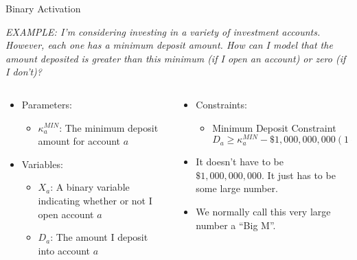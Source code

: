 \documentclass[10pt, aspectratio=169]{beamer}
\begin{document}
\begin{frame}{Binary Activation}
    \begin{center}
        \textit{EXAMPLE: I'm considering investing in a variety of investment accounts. However, each one has a minimum deposit amount. How can I model that the amount deposited is greater than this minimum (if I open an account) or zero (if I don't)?}
    \end{center}
    \begin{columns}
        \begin{column}{0.5\textwidth}
            \begin{itemize}
                \item Parameters:
                \begin{itemize}
                    \item $\kappa^{MIN}_a$: The minimum deposit amount for account $a$
                \end{itemize}
                \item Variables:
                \begin{itemize}
                    \item $X_a$: A binary variable indicating whether or not I open account $a$
                    \item $D_a$: The amount I deposit into account $a$
                \end{itemize}
            \end{itemize}
        \end{column}
        \begin{column}{0.5\textwidth}
            \begin{itemize}
                \item Constraints:
                \begin{itemize}
                    \item Minimum Deposit Constraint
                    $$D_a \geq \kappa^{MIN}_a - \$1,000,000,000 (1-X_a)$$
                \end{itemize}
                \item It doesn't have to be $\$1,000,000,000$. It just has to be some large number.
                \item We normally call this very large number a \enquote{Big M}.
            \end{itemize}
        \end{column}
    \end{columns}
\end{frame}
\end{document}
